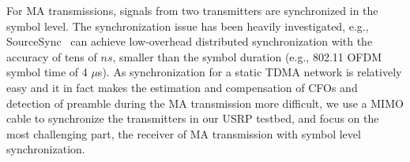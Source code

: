 For  MA transmissions, signals from two transmitters are synchronized in the symbol level. The synchronization issue has been heavily investigated, e.g.,
SourceSync~\cite{sourcesync} can achieve low-overhead distributed synchronization with the accuracy of tens of $ns$, 
smaller than the symbol duration (e.g., 802.11 OFDM symbol time of 4 $\mu$s).
 As synchronization for a static TDMA network is relatively easy and it in fact makes the estimation and compensation of CFOs and detection of preamble during the MA transmission more difficult, we use a MIMO cable to synchronize the transmitters in our USRP testbed, and focus on the most challenging part,  the receiver of MA transmission with symbol level synchronization.




